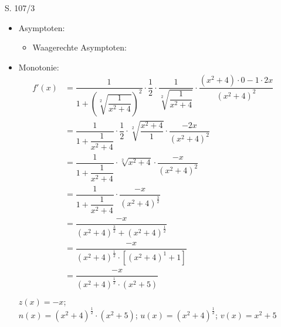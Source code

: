 \begin{Exercise}{S. 107/3}{}
\begin{enumerate}
\begin{enumerate}[label=\alph*),leftmargin=*]
{\begin{itemize}[leftmargin=*]
{\begin{align*}
                    \end{align*}
                    }
                \item Asymptoten: \\[-3.0ex]{
                    \begin{itemize}
                        \item Waagerechte Asymptoten: 
                    \end{itemize}
                    }
                \item Monotonie: \\[-2.0ex]{
                    \begin{align*}
                        f'(x) &= \dfrac{1}{1 + \left(\sqrt[2]{\dfrac{1}{x^{2}+4}}\right)^{2}} \cdot \dfrac{1}{2} \cdot \dfrac{1}{\sqrt[2]{\dfrac{1}{x^{2}+4}}} \cdot \dfrac{\left(x^{2} + 4\right) \cdot 0 - 1 \cdot 2x}{\left(x^{2} + 4\right)^{2}} &&\\[1.5ex]
                        &= \dfrac{1}{1 + \dfrac{1}{x^{2}+4}} \cdot \dfrac{1}{2} \cdot \sqrt[2]{\dfrac{x^{2}+4}{1}} \cdot \dfrac{-2x}{\left(x^{2} + 4\right)^{2}} &&\\[1.5ex]
                        &= \dfrac{1}{1 + \dfrac{1}{x^{2}+4}} \cdot \sqrt[2]{x^{2}+4} \cdot \dfrac{-x}{\left(x^{2} + 4\right)^{2}} &&\\[1.5ex]
                        &= \dfrac{1}{1 + \dfrac{1}{x^{2}+4}} \cdot \dfrac{-x}{\left(x^{2} + 4\right)^{\frac{3}{2}}} &&\\[1.5ex]
                        &= \dfrac{-x}{\left(x^{2} + 4\right)^{\frac{3}{2}} + \left(x^{2} + 4\right)^{\frac{1}{2}}} &&\\[1.5ex]
                        &= \dfrac{-x}{\left(x^{2} + 4\right)^{\frac{1}{2}} \cdot \left[\left(x^{2} + 4\right)^{1} + 1 \right]} &&\\[1.5ex]
                        &= \dfrac{-x}{\left(x^{2} + 4\right)^{\frac{1}{2}} \cdot \left(x^{2} + 5 \right)} &&\\[-2.0ex]
                    \end{align*}
                    $z(x) = -x$; \\[1.0ex]
                    $n(x) = \left(x^{2} + 4\right)^{\frac{1}{2}} \cdot \left(x^{2} + 5 \right)$; \qquad $u(x) = \left(x^{2} + 4\right)^{\frac{1}{2}}$; \qquad $v(x) = x^{2} + 5$\\[1.5ex]
}
\end{itemize}}
\end{enumerate}
\end{enumerate}
\end{Exercise}
